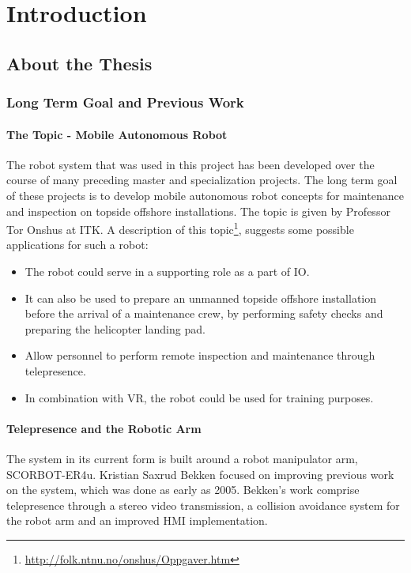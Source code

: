 \chapter{Introduction}
\label{chp:introduction} 

\section{About the Thesis}

\subsection{Long Term Goal and Previous Work}

\subsubsection{The Topic - Mobile Autonomous Robot}

The robot system that was used in this project has been developed over the course of many preceding master and specialization projects. The long term goal of these projects is to develop mobile autonomous robot concepts for maintenance and inspection on topside offshore installations. The topic is given by Professor Tor Onshus at \ac{ITK}. A description of this topic\footnote{\url{http://folk.ntnu.no/onshus/Oppgaver.htm}}, suggests some possible applications for such a robot: 

\begin{itemize}
	\item The robot could serve in a supporting role as a part of \ac{IO}.
	\item It can also be used to prepare an unmanned topside offshore installation before the arrival of a maintenance crew, by performing safety checks and preparing the helicopter landing pad.  
	\item Allow personnel to perform remote inspection and maintenance through telepresence.
	\item  In combination with \ac{VR}, the robot could be used for training purposes. 
\end{itemize}

\subsubsection{Telepresence and the Robotic Arm}

The system in its current form is built around a robot manipulator arm, SCORBOT-ER4u. Kristian Saxrud Bekken focused on improving previous work on the system, which was done as early as 2005\cite{bekken}. Bekken's work comprise telepresence through a stereo video transmission, a collision avoidance system for the robot arm and an improved \ac{HMI} implementation.

